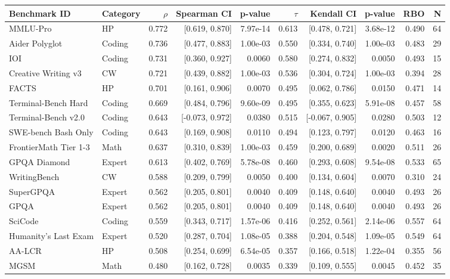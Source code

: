 \begin{tabular}{llrrrrrrrr}
\toprule
Benchmark ID & Category & $\rho$ & Spearman CI & p-value & $\tau$ & Kendall CI & p-value & RBO & N \\
\midrule
MMLU-Pro & HP & 0.772 & [0.619, 0.870] & 7.97e-14 & 0.613 & [0.478, 0.721] & 3.68e-12 & 0.490 & 64 \\
Aider Polyglot & Coding & 0.736 & [0.477, 0.883] & 1.00e-03 & 0.550 & [0.334, 0.740] & 1.00e-03 & 0.483 & 29 \\
IOI & Coding & 0.731 & [0.360, 0.927] & 0.0060 & 0.580 & [0.274, 0.832] & 0.0050 & 0.493 & 15 \\
Creative Writing v3 & CW & 0.721 & [0.439, 0.882] & 1.00e-03 & 0.536 & [0.304, 0.724] & 1.00e-03 & 0.394 & 28 \\
FACTS & HP & 0.701 & [0.161, 0.906] & 0.0070 & 0.495 & [0.062, 0.786] & 0.0150 & 0.471 & 14 \\
Terminal-Bench Hard & Coding & 0.669 & [0.484, 0.796] & 9.60e-09 & 0.495 & [0.355, 0.623] & 5.91e-08 & 0.457 & 58 \\
Terminal-Bench v2.0 & Coding & 0.643 & [-0.073, 0.972] & 0.0380 & 0.515 & [-0.067, 0.905] & 0.0280 & 0.503 & 12 \\
SWE-bench Bash Only & Coding & 0.643 & [0.169, 0.908] & 0.0110 & 0.494 & [0.123, 0.797] & 0.0120 & 0.463 & 16 \\
FrontierMath Tier 1-3 & Math & 0.637 & [0.310, 0.839] & 1.00e-03 & 0.459 & [0.200, 0.689] & 0.0020 & 0.511 & 26 \\
GPQA Diamond & Expert & 0.613 & [0.402, 0.769] & 5.78e-08 & 0.460 & [0.293, 0.608] & 9.54e-08 & 0.533 & 65 \\
WritingBench & CW & 0.588 & [0.209, 0.799] & 0.0050 & 0.400 & [0.134, 0.604] & 0.0070 & 0.310 & 24 \\
SuperGPQA & Expert & 0.562 & [0.205, 0.801] & 0.0040 & 0.409 & [0.148, 0.640] & 0.0040 & 0.493 & 26 \\
GPQA & Expert & 0.562 & [0.205, 0.801] & 0.0040 & 0.409 & [0.148, 0.640] & 0.0040 & 0.493 & 26 \\
SciCode & Coding & 0.559 & [0.343, 0.717] & 1.57e-06 & 0.416 & [0.252, 0.561] & 2.14e-06 & 0.557 & 64 \\
Humanity's Last Exam & Expert & 0.520 & [0.287, 0.704] & 1.08e-05 & 0.388 & [0.204, 0.548] & 1.09e-05 & 0.549 & 64 \\
AA-LCR & HP & 0.508 & [0.254, 0.699] & 6.54e-05 & 0.357 & [0.166, 0.518] & 1.22e-04 & 0.355 & 56 \\
MGSM & Math & 0.480 & [0.162, 0.728] & 0.0035 & 0.339 & [0.109, 0.555] & 0.0045 & 0.452 & 35 \\

\end{tabular}
